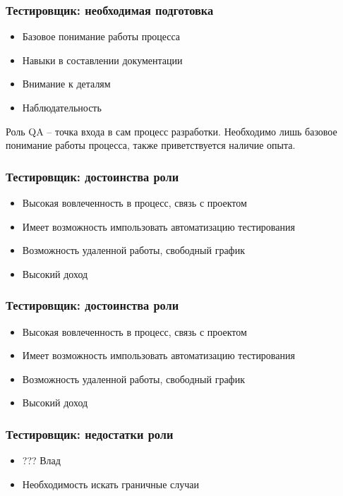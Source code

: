\documentclass{../industrial-development}
\begin{document}
	\begin{frame} \frametitle{Тестировщик: необходимая подготовка}
		\begin{itemize}
			\item Базовое понимание работы процесса
			\item Навыки в составлении документации
			\item Внимание к деталям
			\item Наблюдательность 
		\end{itemize}
		\begin{block}{}
			\alert {}Роль QA – точка входа в сам процесс разработки. Необходимо лишь базовое понимание работы процесса, также приветствуется наличие опыта. 
		\end{block}
		
	\end{frame}
	
	\begin{frame} \frametitle{Тестировщик: достоинства роли}
		\begin{itemize}
			\item Высокая вовлеченность в процесс, связь с проектом
			\item Имеет возможность импользовать автоматизацию тестирования
			\item Возможность удаленной работы, свободный график
			\item Высокий доход
		\end{itemize}
	\end{frame}
	
	\begin{frame} \frametitle{Тестировщик: достоинства роли}
		\begin{itemize}
			\item Высокая вовлеченность в процесс, связь с проектом
			\item Имеет возможность импользовать автоматизацию тестирования
			\item Возможность удаленной работы, свободный график
			\item Высокий доход
		\end{itemize}
	\end{frame}
	
	\begin{frame} \frametitle{Тестировщик: недостатки роли}
		\begin{itemize}
			\item ??? Влад
			\item Необходимость искать граничные случаи
		\end{itemize}
	\end{frame}
	
\end{document}
